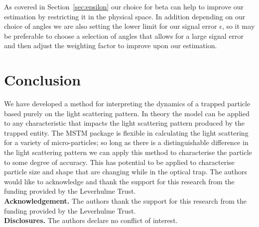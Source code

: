 \documentclass[final, 3p]{elsarticle}
\begin{document}
As covered in Section~\ref{sec:epsilon} our choice for beta can help to
improve our estimation by restricting it in the physical space. In
addition depending on our choice of angles we are also setting the
lower limit for our signal error $\epsilon$, so it may be preferable
to choose a selection of angles that allows for a large signal error
and then adjust the weighting factor to improve upon our estimation.


\section{Conclusion}
\label{sec:Conclusion}

We have developed a method for interpreting the dynamics of a trapped
particle based purely on the light scattering pattern. In theory the
model can be applied to any characteristic that impacts the light
scattering pattern produced by the trapped entity. The MSTM package is
flexible in calculating the light scattering for a variety of
micro-particles; so long as there is a distinguishable difference in
the light scattering pattern we can apply this method to characterise
the particle to some degree of accuracy. This has potential to be
applied to characterise particle size and shape that are changing
while in the optical trap. The authors would like to acknowledge and
thank the support for this research from the funding provided by the
Leverhulme Trust.\\



\noindent \textbf{Acknowledgement.} The authors thank the support for this research from the funding provided by the Leverhulme Trust. \\
  
\noindent \textbf{Disclosures.} The authors declare no conflict of interest. \\


 



\newpage
\appendix
\onecolumn
\end{document}
